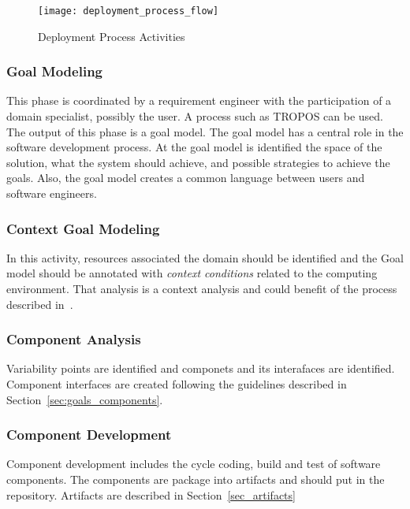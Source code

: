 \label{sub:Proposal}
\begin{figure*}[!htb]
  \centering
  \texttt{[image: deployment\_process\_flow]}
  \caption{Deployment Process Activities}
\label{fig:deployment_process_flow}
\end{figure*}

\subsubsection{Goal Modeling}
This phase is coordinated by a requirement engineer with the participation of a domain specialist, possibly the user.
A process such as TROPOS can be used. The output of this phase is a goal model.
The goal model has a central role in the software development process. At the goal model is identified the space of the solution, what the system should achieve, and possible strategies to achieve the goals. Also, the goal model creates a common language between users and software engineers.

\subsubsection{Context Goal Modeling}
In this activity, resources associated the domain should be identified and the Goal model should be annotated with \emph{context conditions} related to the computing environment. That analysis is a context analysis and could benefit of the process described in~\cite{ali_goal-based_2010}.

\subsubsection{Component Analysis}

Variability points are identified and componets and its interafaces are identified. Component interfaces are created following the guidelines described in Section~\ref{sec:goals_components}.

\subsubsection{Component Development}

Component development includes the cycle coding, build and test of software components.
The components are package into artifacts and should put in the repository. Artifacts are described in Section~\ref{sec_artifacts}
